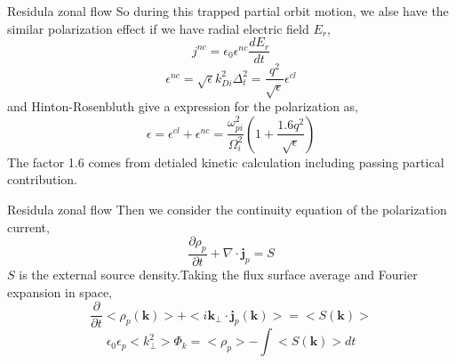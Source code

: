 \documentclass{beamer}
\begin{document}
\begin{frame}{Residula zonal flow}
	So during this trapped partial orbit motion, we alse have the similar polarization effect if we have radial electric field $E_r$, 
	\begin{equation}
	j^{nc}=\epsilon_0\epsilon^{nc}\frac{dE_r}{dt}
	\end{equation}
	\begin{equation}
	\epsilon^{nc}=\sqrt{\epsilon}k_{Di}^2\Delta_t^2=\frac{q^2}{\sqrt{\epsilon}}\epsilon^{cl}
	\end{equation}
	and Hinton-Rosenbluth give a expression for the polarization as,
	\begin{equation}
	\epsilon=\epsilon^{cl}+\epsilon^{nc}=\frac{\omega_{pi}^2}{\Omega_i^2}(1+\frac{1.6q^2}{\sqrt{\epsilon}})
	\end{equation}
	The factor 1.6 comes from detialed kinetic calculation including passing partical contribution.
\end{frame}

\begin{frame}{Residula zonal flow}
	Then we consider the continuity equation of the polarization current,
	\begin{equation}
	\frac{\partial\rho_p}{\partial{t}}+\nabla\cdot\pmb{j}_p=S		
	\end{equation}
	$S$ is the external source density.Taking the flux surface average and Fourier expansion in space, 
	\begin{equation}
	\frac{\partial}{\partial{t}}<\rho_p(\pmb{k})>+<i\pmb{k}_\perp\cdot{\pmb{j}_p}(\pmb{k})>=<S(\pmb{k})>
	\end{equation}
	\begin{equation}
	\epsilon_0\epsilon_p<k_\perp^2>\Phi_k=<\rho_p>-\int<S(\pmb{k})>dt
	\end{equation}
\end{frame}
\end{document}
